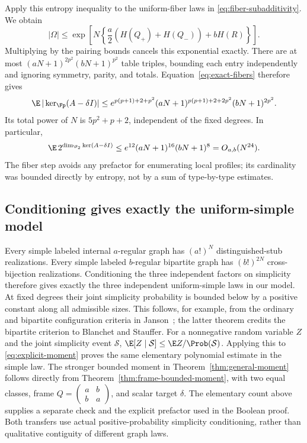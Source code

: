 Apply this entropy inequality to the uniform-fiber laws in
\eqref{eq:fiber-subadditivity}. We obtain
\begin{equation}\label{eq:fiber-bound}
 |\Omega|\le
 \exp\!\left[N\left\{\frac a2(H(Q_+)+H(Q_-))+bH(R)\right\}\right].
\end{equation}
Multiplying by the pairing bounds cancels this exponential exactly.
There are at most $(aN+1)^{2p^2}(bN+1)^{p^2}$ table triples, bounding
each entry independently and ignoring symmetry, parity, and totals.
Equation~\eqref{eq:exact-fibers} therefore gives
\begin{equation}\label{eq:explicit-moment}
 \E\,|\ker_{\Fp}(A-\delta I)|
 \le e^{p(p+1)+2+p^2}
 (aN+1)^{p(p+1)+2+2p^2}(bN+1)^{2p^2}.
\end{equation}
Its total power of $N$ is $5p^2+p+2$, independent of the fixed degrees.
In particular,
\begin{equation}\label{eq:explicit-binary-moment}
 \E\,2^{\dim_{\F_2}\ker(A-\delta I)}
 \le e^{12}(aN+1)^{16}(bN+1)^8
 =O_{a,b}(N^{24}).
\end{equation}
The fiber step avoids any prefactor for enumerating local profiles;
its cardinality was bounded directly by entropy, not by a sum of
type-by-type estimates.

\subsection{Conditioning gives exactly the uniform-simple model}
Every simple labeled internal $a$-regular graph has $(a!)^N$
distinguished-stub realizations. Every simple labeled $b$-regular
bipartite graph has $(b!)^{2N}$ cross-bijection realizations.
Conditioning the three independent factors on simplicity therefore
gives exactly the three independent uniform-simple laws in our model.
At fixed degrees their joint simplicity probability is bounded below
by a positive constant along all admissible sizes. This follows, for
example, from the ordinary and bipartite configuration criteria in
Janson~\cite[Theorems 1.1 and 5.1]{JansonSimple}; the latter theorem
credits the bipartite criterion to Blanchet and Stauffer.
For a nonnegative random variable $Z$ and the joint simplicity event
$\mathcal S$, $\E[Z\mid\mathcal S]\le\E Z/\Prob(\mathcal S)$.
Applying this to \eqref{eq:explicit-moment} proves the same elementary
polynomial estimate in the simple law. The stronger bounded moment in
Theorem~\ref{thm:general-moment} follows directly from
Theorem~\ref{thm:frame-bounded-moment}, with two equal classes, frame
$Q=\left(\begin{smallmatrix}a&b\\b&a\end{smallmatrix}\right)$,
and scalar target $\delta$. The elementary count above supplies a
separate check and the explicit prefactor used in the Boolean proof.
Both transfers use actual positive-probability simplicity conditioning,
rather than qualitative contiguity of different graph laws.
